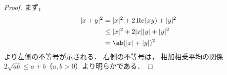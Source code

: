 \documentclass[../sotsu.tex]{subfiles}
\begin{document}
\begin{proof}
    まず，
    \begin{equation*}
        \begin{split}
            \abs{x + y}^2
                &= \abs{x}^2 + 2\Real (xy) + \abs{y}^2    \\
                &\leq \abs{x}^2 + 2 \abs{x} \abs{y} + \abs{y}^2  \\
                &= \ab( \abs{x} + \abs{y} )^2
        \end{split}
    \end{equation*}
    より左側の不等号が示される．
    右側の不等号は，
    相加相乗平均の関係$2\sqrt{ab} \leq a + b$（$a, b > 0$）より明らかである．
\end{proof}
\end{document}

